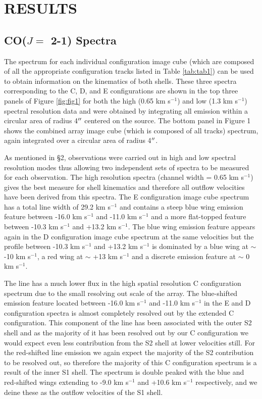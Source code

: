 \documentclass[preprint2]{aastex}
\begin{document}
\section{RESULTS} 

\subsection{CO($J=$ 2-1) Spectra} \label{results1} %

The spectrum for each individual configuration image cube (which are composed of all the appropriate configuration tracks listed in Table \ref{tab:tab1}) can be used to obtain information on the kinematics of both shells. These three spectra corresponding  to the C, D, and E configurations are shown in the top three panels of Figure \ref{fig:fig1} for both the high (0.65 km s${}^{-1}$) and low (1.3 km s${}^{-1}$) spectral resolution data and were obtained by integrating all emission within a circular area of radius 4$\mbox{$^{\prime\prime}$}$ centered on the source. The bottom panel in Figure 1 shows the combined array image cube (which is composed of all tracks) spectrum, again integrated over a circular area of radius 4$\mbox{$^{\prime\prime}$}$.

As mentioned in \S2, observations were carried out in high and low spectral resolution modes thus allowing two independent sets of spectra to be measured for each observation. The high resolution  spectra (channel width = 0.65 km s${}^{-1}$)  gives the best measure for shell kinematics and therefore all   outflow velocities have been derived from this spectra. The E configuration image cube spectrum has a total line width of 29.2 km s${}^{-1}$ and contains a steep blue wing emission feature between -16.0 km s${}^{-1}$ and -11.0 km s${}^{-1}$ and a more flat-topped feature between -10.3 km s${}^{-1}$ and +13.2 km s${}^{-1}$. The blue wing emission feature appears again in the D configuration image cube spectrum at the same velocities but the profile between -10.3 km s${}^{-1}$ and +13.2 km s${}^{-1}$ is dominated by a blue wing at $\sim$ -10 km s${}^{-1}$, a red wing at $\sim$ +13 km s${}^{-1}$ and a discrete emission feature at $\sim$ 0 km s${}^{-1}$. 

The line has a much lower flux in the high spatial resolution C configuration spectrum due to the small resolving out scale of the array. The blue-shifted emission feature located between -16.0 km s${}^{-1}$ and -11.0 km s${}^{-1}$ in the E and D configuration spectra is almost completely resolved out by the extended C configuration. This component of the line has been associated with the outer S2 shell \citep{1987ApJ...313..400H} and as the majority of it has been resolved out by our C configuration we would expect even less contribution from the S2 shell at lower velocities still. For the red-shifted line emission we again expect the majority of the S2 contribution to be resolved out, so therefore the majority of this C configuration spectrum is a result of the inner S1 shell. The spectrum is double peaked with the blue and red-shifted wings extending to -9.0 km s${}^{-1}$ and +10.6 km s${}^{-1}$ respectively, and we deine these as the outflow velocities of the S1 shell. 
\end{document}
